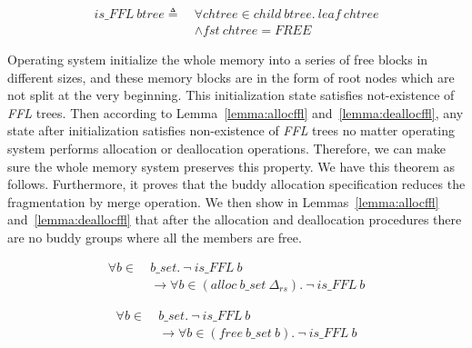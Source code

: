\begin{definition} 
\label{def:FF4}
\end{definition}
\vspace{-19pt}
\begin{align*}
is\_FFL\ btree \triangleq\ &\forall chtree \in child\ btree.\ leaf\ chtree \\
&\wedge fst\ chtree = FREE
\end{align*}
\vspace{-12pt}

Operating system initialize the whole memory into a series of free blocks in different sizes, and these memory blocks are in the form of root nodes which are not split at the very beginning. This initialization state satisfies not-existence of \emph{FFL} trees. Then according to Lemma~\ref{lemma:allocffl} and~\ref{lemma:deallocffl}, any state after initialization satisfies non-existence of \emph{FFL} trees no matter operating system performs allocation or deallocation operations. Therefore, we can make sure the whole memory system preserves this property. We have this theorem as follows. Furthermore, it proves that the buddy allocation specification reduces the fragmentation by merge operation. We then show in Lemmas~\ref{lemma:allocffl} and~\ref{lemma:deallocffl} that after the allocation and deallocation procedures there are no buddy groups where all the members are free.

\begin{lemma} 
\label{lemma:allocffl}
\begin{align*}
\forall b \in\ &b\_set.\ \neg\ is\_FFL\ b\\
&\longrightarrow \forall b \in (alloc\ b\_set\ \Delta_{rs}).\ \neg\ is\_FFL\ b
\end{align*}
\end{lemma}

\begin{lemma} 
\label{lemma:deallocffl}
\begin{align*}
\forall b \in\ &b\_set.\ \neg\ is\_FFL\ b\\
&\longrightarrow \forall b \in (free\ b\_set\ b).\ \neg\ is\_FFL\ b
\end{align*}
\end{lemma}

